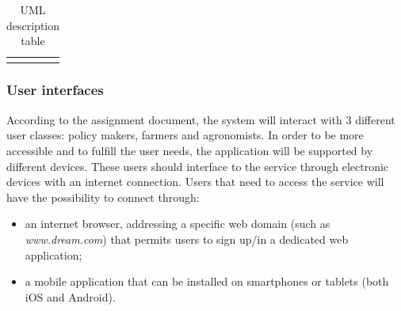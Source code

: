 \begin{center}
\begin{longtable}{|c|m{}|}
        \rowcolor{white}\caption{UML description table}
        \label{tab:UML_description_table}
    \end{longtable}
\end{center}


\subsubsection{User interfaces}
\label{sect:user_interfaces}
According to the assignment document, the system will interact with 3 different user classes: policy makers, farmers and agronomists. In order to be more accessible and to fulfill the user needs, the application will be supported by different devices. These users should interface to the service through electronic devices with an internet connection. Users that need to access the service will have the possibility to connect through:
\begin{itemize}
    \item an internet browser, addressing a specific web domain (such as \textit{www.dream.com}) that permits users to sign up/in a dedicated web application;
    \item a mobile application that can be installed on smartphones or tablets (both iOS and Android).
\end{itemize}


